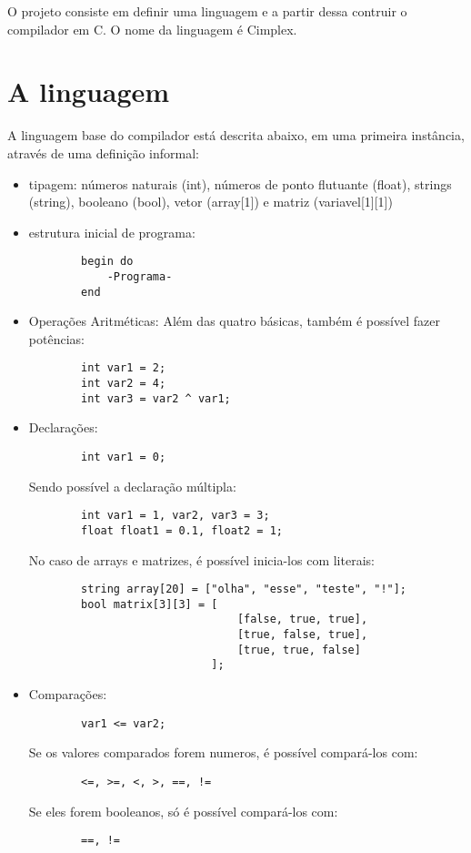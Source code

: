 \label{Cap:Projeto}

O projeto consiste em definir uma linguagem e a partir dessa contruir o compilador em C. O nome da linguagem é Cimplex.

\section{A linguagem}
\label{sec:liguagem_informal}

A linguagem base do compilador está descrita abaixo, em uma primeira instância, através de uma definição informal:

\begin{itemize}
\item{tipagem}: números naturais (int), números de ponto flutuante (float), strings (string), booleano (bool), vetor (array[1]) e matriz (variavel[1][1])
\item{estrutura inicial de programa}: 
	\begin{lstlisting}
		begin do
			-Programa-
		end
	\end{lstlisting}
   
\item{Operações Aritméticas}:
	Além das quatro básicas, também é possível fazer potências:
	\begin{lstlisting}
		int var1 = 2;
		int var2 = 4;
		int var3 = var2 ^ var1;
	\end{lstlisting}

\item{Declarações}: 
	\begin{lstlisting}
		int var1 = 0;
	\end{lstlisting}
    Sendo possível a declaração múltipla:
    \begin{lstlisting}
		int var1 = 1, var2, var3 = 3;
		float float1 = 0.1, float2 = 1;
	\end{lstlisting}
    No caso de arrays e matrizes, é possível inicia-los com literais:
    \begin{lstlisting}
		string array[20] = ["olha", "esse", "teste", "!"];
		bool matrix[3][3] = [
								[false, true, true],
								[true, false, true],
								[true, true, false]
							];
	\end{lstlisting}
\item{Comparações}: 
	\begin{lstlisting}
		var1 <= var2;
	\end{lstlisting}
    Se os valores comparados forem numeros, é possível compará-los com:
    \begin{lstlisting}
		<=, >=, <, >, ==, !=
	\end{lstlisting}
    Se eles forem booleanos, só é possível compará-los com:
    \begin{lstlisting}
		==, !=
	\end{lstlisting}
    

\end{itemize}
